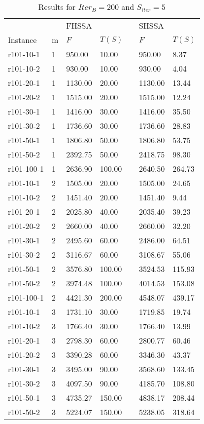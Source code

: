 \documentclass[final,5p,times,twocolumn]{elsarticle}
\begin{document}
{{{{{{{\renewcommand{\arraystretch}{1.2}
\begin{table}[htbp]
\centering
\caption{Results for $Iter_{B}=200$ and $S_{iter}=5$}
\centering
\begin{tabular}{l l l l l l l}
\hline 
&&\multicolumn{2}{l}{FHSSA}&& \multicolumn{2}{l}{SHSSA}\\
\cline{3-4}\cline{6-7}
Instance & m & $F$ & $T(S)$ && $F$ & $T(S)$\\
\hline
r101-10-1&1&950.00&10.00&&950.00&8.37\\
r101-10-2&1&930.00&10.00&&930.00&4.04\\
r101-20-1&1&1130.00&20.00&&1130.00&13.44\\
r101-20-2&1&1515.00&20.00&&1515.00&12.24\\
r101-30-1&1&1416.00&30.00&&1416.00&35.50\\
r101-30-2&1&1736.60&30.00&&1736.60&28.83\\
r101-50-1&1&1806.80&50.00&&1806.80&53.75\\
r101-50-2&1&2392.75&50.00&&2418.75&98.30\\
r101-100-1&1&2636.90&100.00&&2640.50&264.73\\
r101-10-1&2&1505.00&20.00&&1505.00&24.65\\
r101-10-2&2&1451.40&20.00&&1451.40&9.44\\
r101-20-1&2&2025.80&40.00&&2035.40&39.23\\
r101-20-2&2&2660.00&40.00&&2660.00&32.20\\
r101-30-1&2&2495.60&60.00&&2486.00&64.51\\
r101-30-2&2&3116.67&60.00&&3108.67&55.06\\
r101-50-1&2&3576.80&100.00&&3524.53&115.93\\
r101-50-2&2&3974.48&100.00&&4014.53&153.08\\
r101-100-1&2&4421.30&200.00&&4548.07&439.17\\
r101-10-1&3&1731.10&30.00&&1719.85&19.74\\
r101-10-2&3&1766.40&30.00&&1766.40&13.99\\
r101-20-1&3&2798.30&60.00&&2800.77&60.46\\
r101-20-2&3&3390.28&60.00&&3346.30&43.37\\
r101-30-1&3&3495.00&90.00&&3568.60&133.45\\
r101-30-2&3&4097.50&90.00&&4185.70&108.80\\
r101-50-1&3&4735.27&150.00&&4838.17&208.44\\
r101-50-2&3&5224.07&150.00&&5238.05&318.64\\

\end{tabular}
\end{table}}}}}}}}
\end{document}
